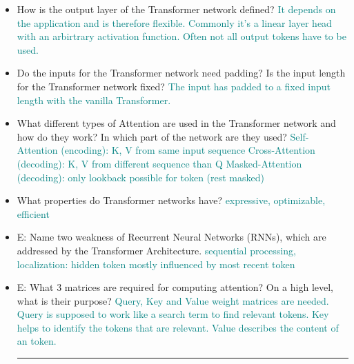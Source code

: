 \documentclass{report}
\newcommand{\asw}[2][teal]{}
\renewcommand{\asw}[2][teal]{\textcolor{#1}{#2}}
\begin{document}
\begin{itemize}
		\item How is the output layer of the Transformer network defined?
		\asw{\newline It depends on the application and is therefore flexible. Commonly it's a linear layer head with an arbirtrary activation function. Often not all output tokens have to be used.}
		\item Do the inputs for the Transformer network need padding? Is the input length for the Transformer network fixed?
		\asw{\newline The input has padded to a fixed input length with the vanilla Transformer.}
		\item What different types of Attention are used in the Transformer network and how do they work? In which part of the network are they used?
		\asw{\newline Self-Attention (encoding): K, V from same input sequence
			\newline Cross-Attention (decoding): K, V from different sequence than Q
			\newline Masked-Attention (decoding): only lookback possible for token (rest masked)}
		\item What properties do Transformer networks have?
		\asw{\newline expressive, optimizable, efficient}
		\item E: Name two weakness of Recurrent Neural Networks (RNNs), which are addressed by the Transformer Architecture.
		\asw{\newline sequential processing, localization: hidden token mostly influenced by most recent token}
		\item E: What 3 matrices are required for computing attention? On a high level, what is their purpose?
		\asw{\newline Query, Key and Value weight matrices are needed. Query is supposed to work like a search term to find relevant tokens. Key helps to identify the tokens that are relevant. Value describes the content of an token.}
		\newline
		\hrule 
		

\end{itemize}
\end{document}

